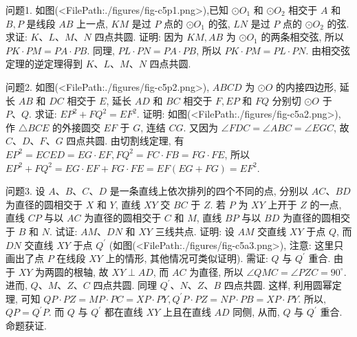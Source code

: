 
问题1. 如图(<FilePath:./figures/fig-c5p1.png>),已知 $\odot O_1$ 和 $\odot O_2$ 相交于 $A$ 和 $B, P$ 是线段 $A B$ 上一点, $K M$ 是过 $P$ 点的 $\odot O_1$ 的弦, $L N$ 是过 $P$ 点的 $\odot O_2$ 的弦.
求证: $K 、 L 、 M 、 N$ 四点共圆.
证明: 因为 $K M, A B$ 为 $\odot O_1$ 的两条相交弦, 所以 $P K \cdot P M=P A \cdot P B$. 同理, $P L \cdot P N=P A \cdot P B$, 所以 $P K \cdot P M=P L \cdot P N$. 由相交弦定理的逆定理得到 $K 、 L 、 M 、 N$ 四点共圆.



问题2. 如图(<FilePath:./figures/fig-c5p2.png>), $A B C D$ 为 $\odot O$ 的内接四边形, 延长 $A B$ 和 $D C$ 相交于 $E$, 延长 $A D$ 和 $B C$ 相交于 $F, E P$ 和 $F Q$ 分别切 $\odot O$ 于 $P 、 Q$. 求证: $E P^2+F Q^2= E F^2$.
证明: 如图(<FilePath:./figures/fig-c5a2.png>), 作 $\triangle B C E$ 的外接圆交 $E F$ 于 $G$, 连结 $C G$. 又因为 $\angle F D C= \angle A B C=\angle E G C$, 故 $C 、 D 、 F 、 G$ 四点共圆.
由切割线定理, 有 $E P^2=E C E D=E G \cdot E F, F Q^2=F C \cdot F B=F G \cdot F E$, 所以 $E P^2+F Q^2=E G \cdot E F+ F G \cdot F E=E F(E G+F G)=E F^2$.



问题3. 设 $A 、 B 、 C 、 D$ 是一条直线上依次排列的四个不同的点, 分别以 $A C 、 B D$ 为直径的圆相交于 $X$ 和 $Y$, 直线 $X Y$ 交 $B C$ 于 $Z$. 若 $P$ 为 $X Y$ 上开于 $Z$ 的一点, 直线 $C P$ 与以 $A C$ 为直径的圆相交于 $C$ 和 $M$, 直线 $B P$ 与以 $B D$ 为直径的圆相交于 $B$ 和 $N$. 试证: $A M 、 D N$ 和 $X Y$ 三线共点.
证明: 设 $A M$ 交直线 $X Y$ 于点 $Q$, 而 $D N$ 交直线 $X Y$ 于点 $Q^{\prime}$ (如图(<FilePath:./figures/fig-c5a3.png>), 注意: 这里只画出了点 $P$ 在线段 $X Y$ 上的情形, 其他情况可类似证明). 需证: $Q$ 与 $Q^{\prime}$ 重合.
由于 $X Y$ 为两圆的根轴, 故 $X Y \perp A D$, 而 $A C$ 为直径, 所以 $\angle Q M C= \angle P Z C=90^{\circ}$. 进而, $Q 、 M 、 Z 、 C$ 四点共圆.
同理 $Q^{\prime} 、 N 、 Z 、 B$ 四点共圆.
这样, 利用圆幂定理, 可知 $Q P \cdot P Z=M P \cdot P C=X P \cdot P Y, Q^{\prime} P \cdot P Z= N P \cdot P B=X P \cdot P Y$. 所以, $Q P=Q^{\prime} P$. 而 $Q$ 与 $Q^{\prime}$ 都在直线 $X Y$ 上且在直线 $A D$ 同侧, 从而, $Q$ 与 $Q^{\prime}$ 重合.
命题获证.



